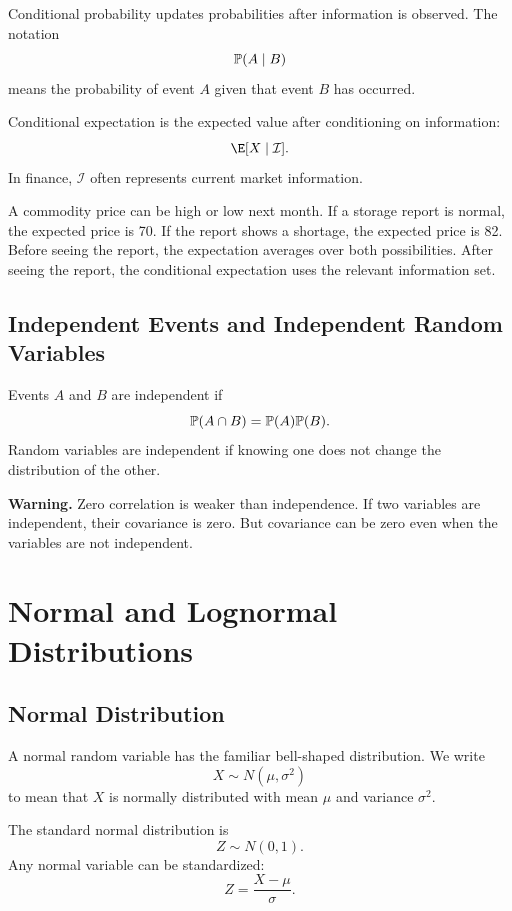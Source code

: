 Conditional probability updates probabilities after information is observed.
The notation
\[
    \mathbb{P}(A\mid B)
\]
means the probability of event $A$ given that event $B$ has occurred.

Conditional expectation is the expected value after conditioning on information:
\[
    \E[X\mid \mathcal{I}].
\]
In finance, $\mathcal{I}$ often represents current market information.

\begin{exmp}
A commodity price can be high or low next month. If a storage report is normal,
the expected price is 70. If the report shows a shortage, the expected price is
82. Before seeing the report, the expectation averages over both possibilities.
After seeing the report, the conditional expectation uses the relevant
information set.
\end{exmp}

\subsection{Independent Events and Independent Random Variables}

Events $A$ and $B$ are independent if
\[
    \mathbb{P}(A\cap B)=\mathbb{P}(A)\mathbb{P}(B).
\]
Random variables are independent if knowing one does not change the distribution
of the other.

\begin{boxF}
\textbf{Warning.} Zero correlation is weaker than independence. If two variables
are independent, their covariance is zero. But covariance can be zero even when
the variables are not independent.
\end{boxF}

\section{Normal and Lognormal Distributions}

\subsection{Normal Distribution}

A normal random variable has the familiar bell-shaped distribution. We write
\[
    X\sim N(\mu,\sigma^2)
\]
to mean that $X$ is normally distributed with mean $\mu$ and variance
$\sigma^2$.

The standard normal distribution is
\[
    Z\sim N(0,1).
\]
Any normal variable can be standardized:
\[
    Z=\frac{X-\mu}{\sigma}.
\]

